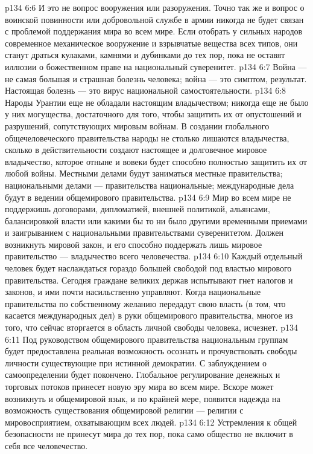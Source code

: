 \vs p134 6:6 И это не вопрос вооружения или разоружения. Точно так же и вопрос о воинской повинности или добровольной службе в армии никогда не будет связан с проблемой поддержания мира во всем мире. Если отобрать у сильных народов современное механическое вооружение и взрывчатые вещества всех типов, они станут драться кулаками, камнями и дубинками до тех пор, пока не оставят иллюзии о божественном праве на национальный суверенитет.
\vs p134 6:7 Война --- не самая большая и страшная болезнь человека; война --- это симптом, результат. Настоящая болезнь --- это вирус национальной самостоятельности.
\vs p134 6:8 Народы Урантии еще не обладали настоящим владычеством; никогда еще не было у них могущества, достаточного для того, чтобы защитить их от опустошений и разрушений, сопутствующих мировым войнам. В создании глобального общечеловеческого правительства народы не столько лишаются владычества, сколько в действительности создают настоящее и долговечное мировое владычество, которое отныне и вовеки будет способно полностью защитить их от любой войны. Местными делами будут заниматься местные правительства; национальными делами --- правительства национальные; международные дела будут в ведении общемирового правительства.
\vs p134 6:9 Мир во всем мире не поддержишь договорами, дипломатией, внешней политикой, альянсами, балансировкой власти или какими бы то ни было другими временными приемами и заигрыванием с национальными правительствами суверенитетом. Должен возникнуть мировой закон, и его способно поддержать лишь мировое правительство --- владычество всего человечества.
\vs p134 6:10 Каждый отдельный человек будет наслаждаться гораздо большей свободой под властью мирового правительства. Сегодня граждане великих держав испытывают гнет налогов и законов, и ими почти насильственно управляют. Когда национальные правительства по собственному желанию передадут свою власть (в том, что касается международных дел) в руки общемирового правительства, многое из того, что сейчас вторгается в область личной свободы человека, исчезнет.
\vs p134 6:11 Под руководством общемирового правительства национальным группам будет предоставлена реальная возможность осознать и прочувствовать свободы личности существующие при истинной демократии. С заблуждением о самоопределении будет покончено. Глобальное регулирование денежных и торговых потоков принесет новую эру мира во всем мире. Вскоре может возникнуть и общемировой язык, и по крайней мере, появится надежда на возможность существования общемировой религии --- религии с мировосприятием, охватывающим всех людей.
\vs p134 6:12 Устремления к общей безопасности не принесут мира до тех пор, пока само общество не включит в себя все человечество.
